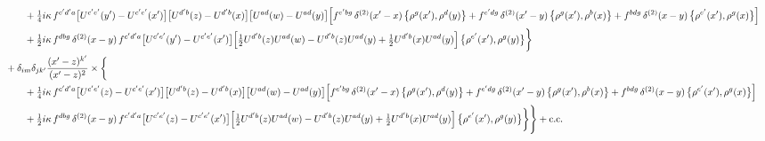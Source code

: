 \documentclass[10pt]{article}
\numberwithin{equation}{section}
\begin{document}
\begin{align}
&\qquad\quad+\tfrac14 i\kappa\,f^{c^{\prime}d^{\prime}a}\big[U^{c^{\prime}e^{\prime}}(y^{\prime})-U^{c^{\prime}e^{\prime}}(x^{\prime})\big]\big[U^{d^{\prime}b}(z)-U^{d^{\prime}b}(x)\big]\big[U^{ad}(w)-U^{ad}(y)\big]\Big[f^{e^{\prime}bg}\,\delta^{(2)}(x^{\prime}-x)\,\big\{\rho^{g}(x^{\prime}),\rho^{d}(y)\big\}+f^{e^{\prime}dg}\,\delta^{(2)}(x^{\prime}-y)\,\big\{\rho^{g}(x^{\prime}),\rho^{b}(x)\big\}+f^{bdg}\,\delta^{(2)}(x-y)\,\big\{\rho^{e^{\prime}}(x^{\prime}),\rho^{g}(x)\big\}\Big]\notag\\
&\qquad\quad+\tfrac12 i\kappa\,f^{dbg}\,\delta^{(2)}(x-y)\,f^{c^{\prime}d^{\prime}a}\big[U^{c^{\prime}e^{\prime}}(y^{\prime})-U^{c^{\prime}e^{\prime}}(x^{\prime})\big]\Big[\tfrac12U^{d^{\prime}b}(z)U^{ad}(w)-U^{d^{\prime}b}(z)U^{ad}(y)+\tfrac12U^{d^{\prime}b}(x)U^{ad}(y)\Big]\,\big\{\rho^{e^{\prime}}(x^{\prime}),\rho^{g}(y)\big\}\bigg\}\notag\\
&\quad+\delta_{im}\delta_{jk^{\prime}}\frac{(x^{\prime}-z)^{k^{\prime}}}{(x^{\prime}-z)^{2}}\times\bigg\{\notag\\
&\qquad\quad+\tfrac14 i\kappa\,f^{c^{\prime}d^{\prime}a}\big[U^{c^{\prime}e^{\prime}}(z)-U^{c^{\prime}e^{\prime}}(x^{\prime})\big]\big[U^{d^{\prime}b}(z)-U^{d^{\prime}b}(x)\big]\big[U^{ad}(w)-U^{ad}(y)\big]\Big[f^{e^{\prime}bg}\,\delta^{(2)}(x^{\prime}-x)\,\big\{\rho^{g}(x^{\prime}),\rho^{d}(y)\big\}+f^{e^{\prime}dg}\,\delta^{(2)}(x^{\prime}-y)\,\big\{\rho^{g}(x^{\prime}),\rho^{b}(x)\big\}+f^{bdg}\,\delta^{(2)}(x-y)\,\big\{\rho^{e^{\prime}}(x^{\prime}),\rho^{g}(x)\big\}\Big]\notag\\
&\qquad\quad+\tfrac12 i\kappa\,f^{dbg}\,\delta^{(2)}(x-y)\,f^{c^{\prime}d^{\prime}a}\big[U^{c^{\prime}e^{\prime}}(z)-U^{c^{\prime}e^{\prime}}(x^{\prime})\big]\Big[\tfrac12U^{d^{\prime}b}(z)U^{ad}(w)-U^{d^{\prime}b}(z)U^{ad}(y)+\tfrac12U^{d^{\prime}b}(x)U^{ad}(y)\Big]\,\big\{\rho^{e^{\prime}}(x^{\prime}),\rho^{g}(y)\big\}\bigg\}\Bigg\}+{\rm c.c.}
\end{align}
\newpage
\end{document}
